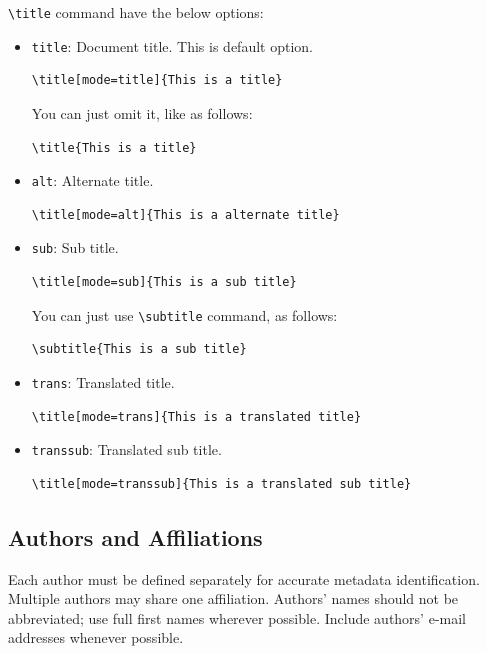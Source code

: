 \documentclass[
]{ceurart}
\begin{document}
\verb|\title|
command have the below options:
\begin{itemize}
\item \verb|title|: Document title. This is default option.
\begin{lstlisting}[language={[latex]TeX}]
\title[mode=title]{This is a title}
\end{lstlisting}

You can just omit it, like as follows:
\begin{lstlisting}[language={[latex]TeX}]
\title{This is a title}
\end{lstlisting}

\item \verb|alt|: Alternate title.
\begin{lstlisting}[language={[latex]TeX}]
\title[mode=alt]{This is a alternate title}
\end{lstlisting}

\item \verb|sub|: Sub title.
\begin{lstlisting}[language={[latex]TeX}]
\title[mode=sub]{This is a sub title}
\end{lstlisting}
You can just use \verb|\subtitle| command, as follows:
\begin{lstlisting}[language={[latex]TeX}]
\subtitle{This is a sub title}
\end{lstlisting}

\item \verb|trans|: Translated title.
\begin{lstlisting}[language={[latex]TeX}]
\title[mode=trans]{This is a translated title}
\end{lstlisting}

\item \verb|transsub|: Translated sub title.
\begin{lstlisting}[language={[latex]TeX}]
\title[mode=transsub]{This is a translated sub title}
\end{lstlisting}
\end{itemize}

\subsection{Authors and Affiliations}

Each author must be defined separately for accurate metadata identification. Multiple authors may share one affiliation. Authors' names should not be abbreviated; use full first names wherever possible. Include authors' e-mail addresses whenever possible.
\end{document}
